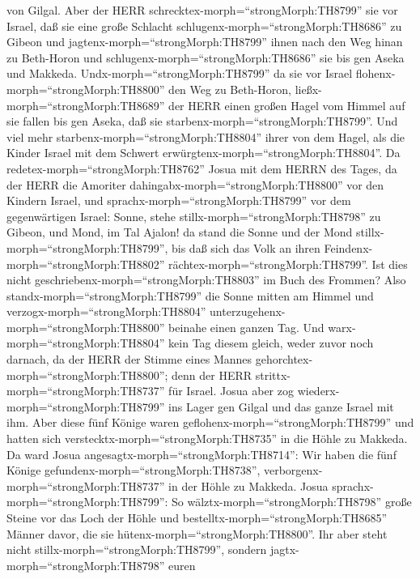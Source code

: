 von Gilgal.  Aber der HERR
schrecktex-morph=``strongMorph:TH8799'' sie vor Israel, daß sie eine
große Schlacht schlugenx-morph=``strongMorph:TH8686'' zu Gibeon und
jagtenx-morph=``strongMorph:TH8799'' ihnen nach den Weg hinan zu
Beth-Horon und schlugenx-morph=``strongMorph:TH8686'' sie bis gen Aseka
und Makkeda.  Undx-morph=``strongMorph:TH8799'' da sie vor
Israel flohenx-morph=``strongMorph:TH8800'' den Weg zu Beth-Horon,
ließx-morph=``strongMorph:TH8689'' der HERR einen großen Hagel vom
Himmel auf sie fallen bis gen Aseka, daß sie
starbenx-morph=``strongMorph:TH8799''. Und viel mehr
starbenx-morph=``strongMorph:TH8804'' ihrer von dem Hagel, als die
Kinder Israel mit dem Schwert erwürgtenx-morph=``strongMorph:TH8804''.
 Da redetex-morph=``strongMorph:TH8762'' Josua mit dem
HERRN des Tages, da der HERR die Amoriter
dahingabx-morph=``strongMorph:TH8800'' vor den Kindern Israel, und
sprachx-morph=``strongMorph:TH8799'' vor dem gegenwärtigen Israel:
Sonne, stehe stillx-morph=``strongMorph:TH8798'' zu Gibeon, und Mond, im
Tal Ajalon!  da stand die Sonne und der Mond
stillx-morph=``strongMorph:TH8799'', bis daß sich das Volk an ihren
Feindenx-morph=``strongMorph:TH8802''
rächtex-morph=``strongMorph:TH8799''. Ist dies nicht
geschriebenx-morph=``strongMorph:TH8803'' im Buch des Frommen? Also
standx-morph=``strongMorph:TH8799'' die Sonne mitten am Himmel und
verzogx-morph=``strongMorph:TH8804''
unterzugehenx-morph=``strongMorph:TH8800'' beinahe einen ganzen Tag.
 Und warx-morph=``strongMorph:TH8804'' kein Tag diesem
gleich, weder zuvor noch darnach, da der HERR der Stimme eines Mannes
gehorchtex-morph=``strongMorph:TH8800''; denn der HERR
strittx-morph=``strongMorph:TH8737'' für Israel.  Josua
aber zog wiederx-morph=``strongMorph:TH8799'' ins Lager gen Gilgal und
das ganze Israel mit ihm.  Aber diese fünf Könige waren
geflohenx-morph=``strongMorph:TH8799'' und hatten sich
verstecktx-morph=``strongMorph:TH8735'' in die Höhle zu Makkeda.
 Da ward Josua angesagtx-morph=``strongMorph:TH8714'': Wir
haben die fünf Könige gefundenx-morph=``strongMorph:TH8738'',
verborgenx-morph=``strongMorph:TH8737'' in der Höhle zu Makkeda.
 Josua sprachx-morph=``strongMorph:TH8799'': So
wälztx-morph=``strongMorph:TH8798'' große Steine vor das Loch der Höhle
und bestelltx-morph=``strongMorph:TH8685'' Männer davor, die sie
hütenx-morph=``strongMorph:TH8800''.  Ihr aber steht nicht
stillx-morph=``strongMorph:TH8799'', sondern
jagtx-morph=``strongMorph:TH8798'' euren
